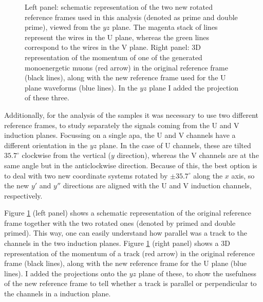 \begin{figure}[t]
\begin{subfigure}{0.5\textwidth}
	\end{subfigure}
	\caption[Schematic representation of the two rotated reference frames used in the analysis of the \gls{mc} filter performance.]{Left panel: schematic representation of the two new rotated reference frames used in this analysis (denoted as prime and double prime), viewed from the $yz$ plane. The magenta stack of lines represent the wires in the U plane, whereas the green lines correspond to the wires in the V plane. Right panel: 3D representation of the momentum of one of the generated monoenergetic muons (red arrow) in the original reference frame (black lines), along with the new reference frame used for the U plane waveforms (blue lines). In the $yz$ plane I added the projection of these three.}
	\label{fig:reference_frame}
\end{figure}

Additionally, for the analysis of the samples it was necessary to use two different reference frames, to study separately the signals coming from the U and V induction planes. Focussing on a single \gls{apa}, the U and V channels have a different orientation in the $yz$ plane. In the case of U channels, these are tilted $35.7^{\circ}$ clockwise from the vertical ($y$ direction), whereas the V channels are at the same angle but in the anticlockwise direction. Because of this, the best option is to deal with two new coordinate systems rotated by $\pm 35.7^{\circ}$ along the $x$ axis, so the new $y'$ and $y''$ directions are aligned with the U and V induction channels, respectively.

Figure \ref{fig:reference_frame} (left panel) shows a schematic representation of the original reference frame together with the two rotated ones (denoted by primed and double primed). This way, one can easily understand how parallel was a track to the channels in the two induction planes. Figure \ref{fig:reference_frame} (right panel) shows a 3D representation of the momentum of a track (red arrow) in the original reference frame (black lines), along with the new reference frame for the U plane (blue lines). I added the projections onto the $yz$ plane of these, to show the usefulness of the new reference frame to tell whether a track is parallel or perpendicular to the channels in a induction plane.


